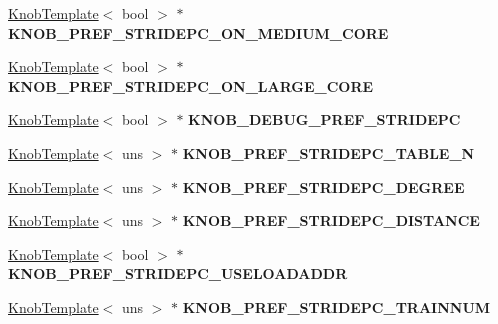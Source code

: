 \begin{DoxyCompactItemize}
\item 
\hypertarget{classall__knobs__c_a207671263e76c8e3e7329d0a4585ddfc}{
\hyperlink{classKnobTemplate}{KnobTemplate}$<$ bool $>$ $\ast$ {\bfseries KNOB\_\-PREF\_\-STRIDEPC\_\-ON\_\-MEDIUM\_\-CORE}}
\label{classall__knobs__c_a207671263e76c8e3e7329d0a4585ddfc}

\item 
\hypertarget{classall__knobs__c_a86d022e05bf06b8110ff803e68af6191}{
\hyperlink{classKnobTemplate}{KnobTemplate}$<$ bool $>$ $\ast$ {\bfseries KNOB\_\-PREF\_\-STRIDEPC\_\-ON\_\-LARGE\_\-CORE}}
\label{classall__knobs__c_a86d022e05bf06b8110ff803e68af6191}

\item 
\hypertarget{classall__knobs__c_a293a0011f1186a0665bdb7b04eff78cb}{
\hyperlink{classKnobTemplate}{KnobTemplate}$<$ bool $>$ $\ast$ {\bfseries KNOB\_\-DEBUG\_\-PREF\_\-STRIDEPC}}
\label{classall__knobs__c_a293a0011f1186a0665bdb7b04eff78cb}

\item 
\hypertarget{classall__knobs__c_ad56ca7cd7eac42b80706317cd6d52aff}{
\hyperlink{classKnobTemplate}{KnobTemplate}$<$ uns $>$ $\ast$ {\bfseries KNOB\_\-PREF\_\-STRIDEPC\_\-TABLE\_\-N}}
\label{classall__knobs__c_ad56ca7cd7eac42b80706317cd6d52aff}

\item 
\hypertarget{classall__knobs__c_af6dbd1b2bbbd3c831c029dee53b83b20}{
\hyperlink{classKnobTemplate}{KnobTemplate}$<$ uns $>$ $\ast$ {\bfseries KNOB\_\-PREF\_\-STRIDEPC\_\-DEGREE}}
\label{classall__knobs__c_af6dbd1b2bbbd3c831c029dee53b83b20}

\item 
\hypertarget{classall__knobs__c_ada88a6e5de68b9199569752c4170d1cf}{
\hyperlink{classKnobTemplate}{KnobTemplate}$<$ uns $>$ $\ast$ {\bfseries KNOB\_\-PREF\_\-STRIDEPC\_\-DISTANCE}}
\label{classall__knobs__c_ada88a6e5de68b9199569752c4170d1cf}

\item 
\hypertarget{classall__knobs__c_ab1a50e8b3e8057f9b0ce68335acf7d6e}{
\hyperlink{classKnobTemplate}{KnobTemplate}$<$ bool $>$ $\ast$ {\bfseries KNOB\_\-PREF\_\-STRIDEPC\_\-USELOADADDR}}
\label{classall__knobs__c_ab1a50e8b3e8057f9b0ce68335acf7d6e}

\item 
\hypertarget{classall__knobs__c_a621277e9be690968858aede7a3708a38}{
\hyperlink{classKnobTemplate}{KnobTemplate}$<$ uns $>$ $\ast$ {\bfseries KNOB\_\-PREF\_\-STRIDEPC\_\-TRAINNUM}}
\label{classall__knobs__c_a621277e9be690968858aede7a3708a38}


\end{DoxyCompactItemize}
